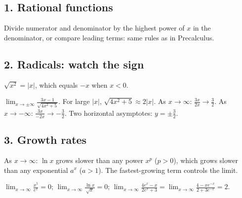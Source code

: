 
\subsection*{1. Rational functions}
Divide numerator and denominator by the highest power of $x$ in the denominator, or compare leading terms: same rules as in Precalculus.

\subsection*{2. Radicals: watch the sign}
$\sqrt{x^2}=|x|$, which equals $-x$ when $x<0$.
\begin{example}[Example 1]
$\displaystyle\lim_{x\to\pm\infty}\frac{3x-1}{\sqrt{4x^2+5}}$.
\sol For large $|x|$, $\sqrt{4x^2+5}\approx2|x|$. As $x\to\infty$: $\frac{3x}{2x}\to\frac32$. As $x\to-\infty$: $\frac{3x}{-2x}\to-\frac32$. Two horizontal asymptotes: $y=\pm\frac32$.
\begin{center}
\end{center}
\end{example}

\subsection*{3. Growth rates}
\begin{keyidea}
As $x\to\infty$: $\ln x$ grows slower than any power $x^p$ ($p>0$), which grows slower than any exponential $a^x$ ($a>1$). The fastest-growing term controls the limit.
\end{keyidea}
\begin{example}[Example 2]
\sol $\displaystyle\lim_{x\to\infty}\frac{x^5}{e^x}=0$; \quad $\displaystyle\lim_{x\to\infty}\frac{\ln x}{\sqrt x}=0$; \quad $\displaystyle\lim_{x\to\infty}\frac{4e^x-x}{2e^x+3}=\lim_{x\to\infty}\frac{4-xe^{-x}}{2+3e^{-x}}=2$.
\end{example}

